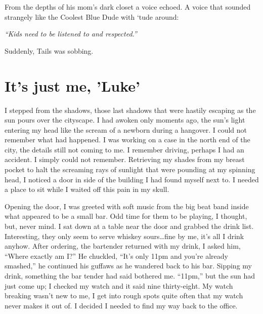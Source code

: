 From the depths of his mom's dark closet a voice echoed. A
voice that sounded strangely like the Coolest Blue Dude with
`tude around:



{\em ``Kids need to be listened to and
respected.''}



Suddenly, Tails was sobbing. 
 






\chapter{It's just me, 'Luke'}




I stepped from the shadows, those last shadows that were hastily
escaping as the sun pours over the cityscape. I had awoken only
moments ago, the sun's light entering my head like the scream of a
newborn during a hangover. I could not remember what had happened.
I was working on a case in the north end of the city, the details
still not coming to me. I remember driving, perhaps I had an
accident. I simply could not remember. Retrieving my shades from my
breast pocket to halt the screaming rays of sunlight that were
pounding at my spinning head, I noticed a door in side of the
building I had found myself next to. I needed a place to sit while
I waited off this pain in my skull.



Opening the door, I was greeted with soft music from the big beat
band inside what appeared to be a small bar. Odd time for them to
be playing, I thought, but, never mind. I sat down at a table near
the door and grabbed the drink list. Interesting, they only seem to
serve whiskey sours{\ldots}fine by me, it's all I drink anyhow. After
ordering, the bartender returned with my drink, I asked him, ``Where
exactly am I?'' He chuckled, ``It's only 11pm and you're already
smashed,'' he continued his guffaws as he wandered back to his bar.
Sipping my drink, something the bar tender had said bothered me.
``11pm,'' but the sun had just come up; I checked my watch and it
said nine thirty-eight. My watch breaking wasn't new to me, I get
into rough spots quite often that my watch never makes it out of. I
decided I needed to find my way back to the office.




